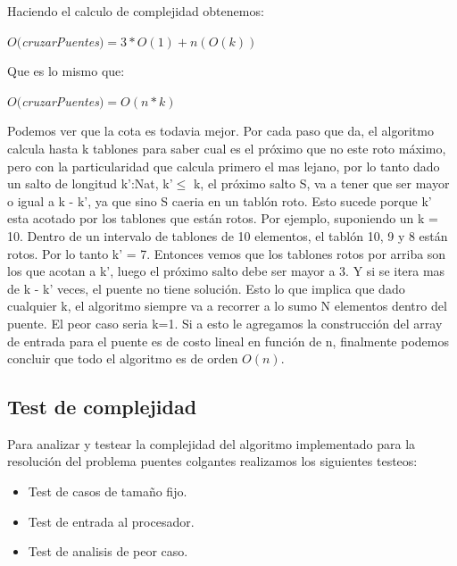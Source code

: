Haciendo el calculo de complejidad obtenemos:

$O($\textit{cruzarPuentes}$) = 3*O(1) + n(O(k))$

Que es lo mismo que:

$O($\textit{cruzarPuentes}$) = O(n*k)$


\label{an}
Podemos ver que la cota es todavia mejor.
Por cada paso que da, el algoritmo calcula hasta k tablones para saber cual es el pr\'oximo que no este roto m\'aximo, pero con la particularidad que calcula primero el mas lejano, por lo tanto dado un salto de longitud k':Nat, k'$\leq$ k, el pr\'oximo salto S, va a tener que ser mayor o igual a k - k', ya que sino S caeria en un tabl\'on roto.
Esto sucede porque k' esta acotado por los tablones que est\'an rotos.
Por ejemplo, suponiendo un k = 10. Dentro de un intervalo de tablones de 10 elementos, el tabl\'on 10, 9 y 8 est\'an rotos. Por lo tanto k' = 7. Entonces vemos que los tablones rotos por arriba son los que acotan a k', luego el pr\'oximo salto debe ser mayor a 3. Y si se itera mas de k - k' veces, el puente no tiene soluci\'on.
Esto lo que implica que dado cualquier k, el algoritmo siempre va a recorrer a lo sumo N elementos dentro del puente. El peor caso seria k=1.
Si a esto le agregamos la construcci\'on del array de entrada para el puente es de costo lineal en funci\'on de n, finalmente podemos concluir que todo el algoritmo es de orden $O(n)$.

\subsection{Test de complejidad}

Para analizar y testear la complejidad del algoritmo implementado para la resoluci\'on del problema puentes colgantes realizamos los siguientes testeos:

\begin{itemize}
  \item Test de casos de tamaño fijo.
  \item Test de entrada al procesador.
  \item Test de analisis de peor caso.
\end{itemize}

